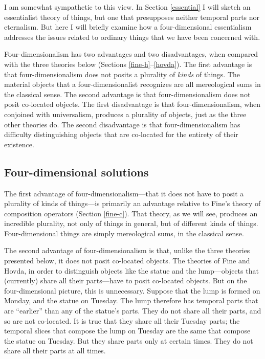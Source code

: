 \documentclass[12pt,twoside]{reedfancy}
\begin{document}
\begin{spacing}{1.25}
I am somewhat sympathetic to this view.  In Section \ref{essential} I
will sketch an essentialist theory of things, but one that presupposes
neither temporal parts nor eternalism.  But here I will briefly
examine how a four-dimensional essentialism addresses the issues
related to ordinary things that we have been concerned with.

Four-dimensionalism has two advantages and two disadvantages, when
compared with the three theories below (Sections
\ref{fine-h}--\ref{hovda}).  The first advantage is that
four-dimensionalism does not posits a plurality of {\em kinds} of
things.  The material objects that a four-dimensionalist recognizes
are all mereological sums in the classical sense.  The second
advantage is that four-dimensionalism does not posit co-located
objects.  The first disadvantage is that four-dimensionalism, when
conjoined with universalism, produces a plurality of objects, just as
the three other theories do.  The second disadvantage is that
four-dimensionalism has difficulty distinguishing objects that are
co-located for the entirety of their existence.

\subsection{Four-dimensional solutions}
\label{4ds}
The first advantage of four-dimensionalism---that it does not have to
posit a plurality of kinds of things---is primarily an advantage
relative to Fine's theory of composition operators (Section
\ref{fine-c}).  That theory, as we will see, produces an incredible
plurality, not only of things in general, but of different kinds of
things.  Four-dimensional things are simply mereological sums, in the
classical sense.

The second advantage of four-dimensionalism is that, unlike the three
theories presented below, it does not posit co-located objects.  The
theories of Fine and Hovda, in order to distinguish objects like the
statue and the lump---objects that (currently) share all their
parts---have to posit co-located objects.  But on the four-dimensional
picture, this is unnecessary.  Suppose that the lump is formed on
Monday, and the statue on Tuesday.  The lump therefore has temporal
parts that are ``earlier'' than any of the statue's parts.  They do
not share all their parts, and so are not co-located.  It is true that
they share all their Tuesday parts; the temporal slices that compose
the lump on Tuesday are the same that compose the statue on Tuesday.
But they share parts only at certain times.  They do not share all
their parts at all times.


\end{spacing}
\end{document}
